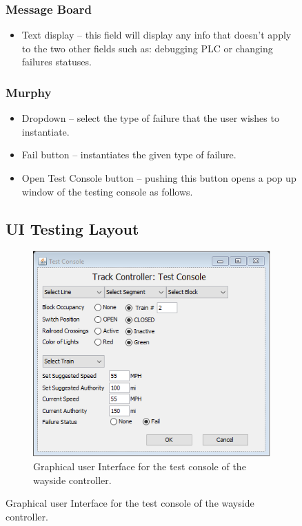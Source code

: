 \begin{figure}[h!]
	\subsubsection{Message Board}
		\begin{itemize}
			\item Text display – this field will display any info that doesn’t apply to the two other fields such as: debugging PLC or changing failures statuses.
		\end{itemize}
	\subsubsection{Murphy}
		\begin{itemize}
			\item Dropdown – select the type of failure that the user wishes to instantiate.
			\item Fail button – instantiates the given type of failure.
			\item Open Test Console button – pushing this button opens a pop up window of the testing console as follows.
		\end{itemize}


\subsection{UI Testing Layout}

\begin{figure}
	\center
	\includegraphics[width=12cm]{trackcontrollertestconsole_gui}
	\caption{Graphical user Interface for the test console of the wayside controller.}
\end{figure}



\end{figure}
